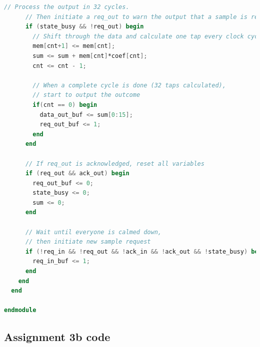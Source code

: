 \documentclass[a4paper,twoside,11pt, fleqn]{article}
\begin{document}
\begin{lstlisting}[language=Verilog]
      // Process the output in 32 cycles. 
      // Then initiate a req_out to warn the output that a sample is ready
      if (state_busy && !req_out) begin
        // Shift through the data and calculate one tap every clock cycle
        mem[cnt+1] <= mem[cnt];
        sum <= sum + mem[cnt]*coef[cnt];
        cnt <= cnt - 1;

        // When a complete cycle is done (32 taps calculated),
        // start to output the outcome
        if(cnt == 0) begin
          data_out_buf <= sum[0:15];
          req_out_buf <= 1;
        end
      end

      // If req_out is acknowledged, reset all variables
      if (req_out && ack_out) begin
        req_out_buf <= 0;
        state_busy <= 0;
        sum <= 0;
      end

      // Wait until everyone is calmed down,
      // then initiate new sample request
      if (!req_in && !req_out && !ack_in && !ack_out && !state_busy) begin   
        req_in_buf <= 1;
      end	
    end
  end

endmodule
\end{lstlisting}

\subsection{Assignment 3b code}
\label{code:3b}
\end{document}

